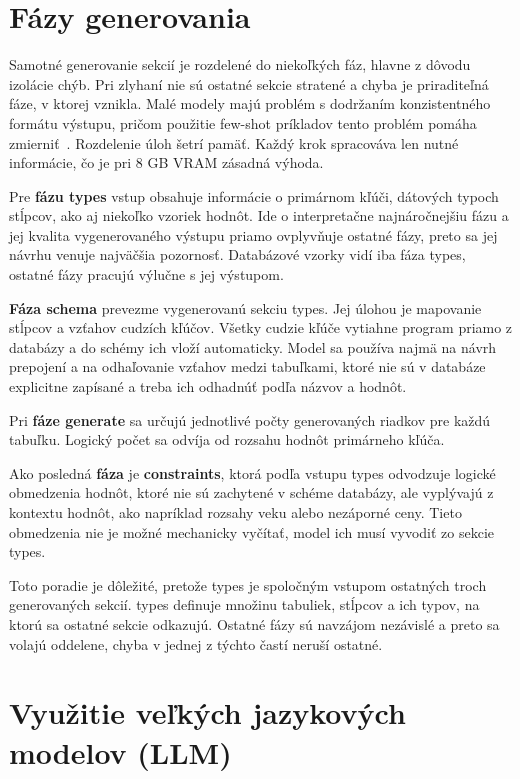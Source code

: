 \section{Fázy generovania}

\label{sub:fazy_generovania}

Samotné generovanie sekcií je rozdelené do niekoľkých fáz, hlavne z dôvodu izolácie chýb. Pri zlyhaní nie sú ostatné sekcie stratené a chyba je priraditeľná fáze, v ktorej vznikla. Malé modely majú problém s dodržaním konzistentného formátu výstupu, pričom použitie few-shot príkladov tento problém pomáha zmierniť~\cite{Pysmennyi2025}. Rozdelenie úloh šetrí pamäť. Každý krok spracováva len nutné informácie, čo je pri 8 GB VRAM zásadná výhoda.


Pre \textbf{fázu types} vstup obsahuje informácie o primárnom kľúči, dátových typoch stĺpcov, ako aj niekoľko vzoriek hodnôt. Ide o interpretačne najnáročnejšiu fázu a jej kvalita vygenerovaného výstupu priamo ovplyvňuje ostatné fázy, preto sa jej návrhu venuje najväčšia pozornosť. Databázové vzorky vidí iba fáza types, ostatné fázy pracujú výlučne s jej výstupom.


\textbf{Fáza schema} prevezme vygenerovanú sekciu types. Jej úlohou je mapovanie stĺpcov a vzťahov cudzích kľúčov. Všetky cudzie kľúče vytiahne program priamo z databázy a do schémy ich vloží automaticky. Model sa používa najmä na návrh prepojení a na odhaľovanie vzťahov medzi tabuľkami, ktoré nie sú v databáze explicitne zapísané a treba ich odhadnúť podľa názvov a hodnôt.


Pri \textbf{fáze generate} sa určujú jednotlivé počty generovaných riadkov pre každú tabuľku. Logický počet sa odvíja od rozsahu hodnôt primárneho kľúča.


Ako posledná \textbf{fáza} je \textbf{constraints}, ktorá podľa vstupu types odvodzuje logické obmedzenia hodnôt, ktoré nie sú zachytené v schéme databázy, ale vyplývajú z kontextu hodnôt, ako napríklad rozsahy veku alebo nezáporné ceny. Tieto obmedzenia nie je možné mechanicky vyčítať, model ich musí vyvodiť zo sekcie types.


Toto poradie je dôležité, pretože types je spoločným vstupom ostatných troch generovaných sekcií. types definuje množinu tabuliek, stĺpcov a ich typov, na ktorú sa ostatné sekcie odkazujú. Ostatné fázy sú navzájom nezávislé a preto sa volajú oddelene, chyba v jednej z týchto častí neruší ostatné. 

\section{Využitie veľkých jazykových modelov (LLM)}

